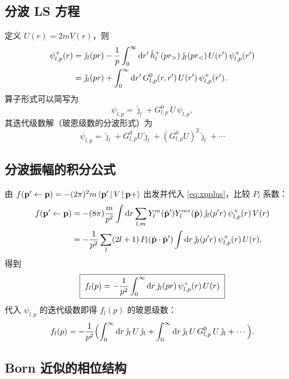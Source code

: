 \subsection{分波 LS 方程}

定义 $U(r)=2mV(r)$，则
\begin{align}\label{eq:LS-pw}
\psi_{l,p}^{+}(r)
&= \hat\jmath_l(pr) - \frac{1}{p}\int_0^\infty \mathrm{d} r'\,
   \hat h_l^+(pr_>)\,\hat\jmath_l(pr_<)\,U(r')\,\psi_{l,p}^{+}(r')\nonumber\\
&= \hat\jmath_l(pr)+\int_0^\infty \mathrm{d} r'\,
   G_{l,p}^{0}(r,r')\,U(r')\,\psi_{l,p}^{+}(r').
\end{align}
算子形式可以简写为
\begin{equation}\label{eq:LS-op}
\psi_{l,p}=\hat\jmath_l+G_{l,p}^{0}\,U\,\psi_{l,p},
\end{equation}
其迭代级数解（玻恩级数的分波形式）为
\[
\psi_{l,p}=\hat\jmath_l+G_{l,p}^{0}U\hat\jmath_l+(G_{l,p}^{0}U)^2\hat\jmath_l+\cdots
\]

\subsection{分波振幅的积分公式}

由 $f(\mathbf p'\leftarrow\mathbf p)=-(2\pi)^2 m\left\langle \mathbf p' \,\middle|\, V \,\middle|\, \mathbf p+ \right\rangle$
出发并代入 \eqref{eq:xpplus}，比较 $P_l$ 系数：
\begin{align}
f(\mathbf p'\leftarrow\mathbf p)
&= -(8\pi)\frac{m}{p^2}\int\mathrm{d} r\sum_{l,m}
   Y_l^m(\hat{\mathbf p}')Y_l^{m*}(\hat{\mathbf p})\,
   \hat\jmath_l(p'r)\,\psi_{l,p}^{+}(r)\,V(r)\nonumber\\
&= -\frac{1}{p^2}\sum_l (2l+1)\,P_l(\hat{\mathbf p}\cdot\hat{\mathbf p}')
   \int\mathrm{d} r\,\hat\jmath_l(p'r)\,\psi_{l,p}^{+}(r)\,U(r),
\end{align}
得到
\begin{equation}\label{eq:fl-ch10-int}
\boxed{\;f_l(p)=-\frac{1}{p^2}\int_0^\infty \mathrm{d} r\,
   \hat\jmath_l(pr)\,\psi_{l,p}^{+}(r)\,U(r)\;}
\end{equation}
代入 $\psi_{l,p}$ 的迭代级数即得 $f_l(p)$ 的玻恩级数：
\begin{equation}
f_l(p)=-\frac{1}{p^2}\Bigl(\int_0^\infty \mathrm{d} r\,\hat\jmath_l\,U\,\hat\jmath_l
+\int_0^\infty \mathrm{d} r\,\hat\jmath_l\,U\,G_{l,p}^{0}\,U\,\hat\jmath_l+\cdots\Bigr).
\end{equation}

\subsection{Born 近似的相位结构}

